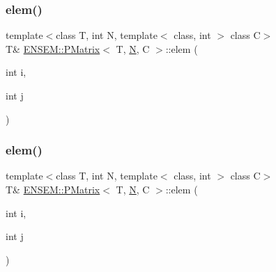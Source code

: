 \mbox{\label{classENSEM_1_1PMatrix_a358c5f1cd954ddda32677d9ad8765ef2}} 
\subsubsection{\texorpdfstring{elem()}{elem()}\hspace{0.1cm}{\footnotesize\ttfamily [2/6]}}
{\footnotesize\ttfamily template$<$class T, int N, template$<$ class, int $>$ class C$>$ \\
T\& \mbox{\hyperlink{classENSEM_1_1PMatrix}{E\+N\+S\+E\+M\+::\+P\+Matrix}}$<$ T, \mbox{\hyperlink{adat__devel_2lib_2hadron_2operator__name__util_8cc_a7722c8ecbb62d99aee7ce68b1752f337}{N}}, C $>$\+::elem (\begin{DoxyParamCaption}\item[{int}]{i,  }\item[{int}]{j }\end{DoxyParamCaption})\hspace{0.3cm}{\ttfamily [inline]}}

\mbox{\label{classENSEM_1_1PMatrix_a358c5f1cd954ddda32677d9ad8765ef2}} 
\subsubsection{\texorpdfstring{elem()}{elem()}\hspace{0.1cm}{\footnotesize\ttfamily [3/6]}}
{\footnotesize\ttfamily template$<$class T, int N, template$<$ class, int $>$ class C$>$ \\
T\& \mbox{\hyperlink{classENSEM_1_1PMatrix}{E\+N\+S\+E\+M\+::\+P\+Matrix}}$<$ T, \mbox{\hyperlink{adat__devel_2lib_2hadron_2operator__name__util_8cc_a7722c8ecbb62d99aee7ce68b1752f337}{N}}, C $>$\+::elem (\begin{DoxyParamCaption}\item[{int}]{i,  }\item[{int}]{j }\end{DoxyParamCaption})\hspace{0.3cm}{\ttfamily [inline]}}

